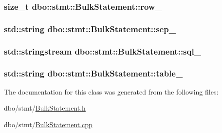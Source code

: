 \hypertarget{classdbo_1_1stmt_1_1_bulk_statement_a354e1122b8e8e2a43769e84f8858023d}{
\subsubsection[{row\+\_\+}]{\setlength{\rightskip}{0pt plus 5cm}size\+\_\+t dbo\+::stmt\+::\+Bulk\+Statement\+::row\+\_\+\hspace{0.3cm}{\ttfamily [protected]}}}\label{classdbo_1_1stmt_1_1_bulk_statement_a354e1122b8e8e2a43769e84f8858023d}
\hypertarget{classdbo_1_1stmt_1_1_bulk_statement_a15af921e3b69e401e9cb2416094dac46}{
\subsubsection[{sep\+\_\+}]{\setlength{\rightskip}{0pt plus 5cm}std\+::string dbo\+::stmt\+::\+Bulk\+Statement\+::sep\+\_\+\hspace{0.3cm}{\ttfamily [protected]}}}\label{classdbo_1_1stmt_1_1_bulk_statement_a15af921e3b69e401e9cb2416094dac46}
\hypertarget{classdbo_1_1stmt_1_1_bulk_statement_ac32b572232a8d0378d420cf44bbca623}{
\subsubsection[{sql\+\_\+}]{\setlength{\rightskip}{0pt plus 5cm}std\+::stringstream dbo\+::stmt\+::\+Bulk\+Statement\+::sql\+\_\+\hspace{0.3cm}{\ttfamily [protected]}}}\label{classdbo_1_1stmt_1_1_bulk_statement_ac32b572232a8d0378d420cf44bbca623}
\hypertarget{classdbo_1_1stmt_1_1_bulk_statement_af3e99f5a3fe342a6295c96927c66c1ed}{
\subsubsection[{table\+\_\+}]{\setlength{\rightskip}{0pt plus 5cm}std\+::string dbo\+::stmt\+::\+Bulk\+Statement\+::table\+\_\+\hspace{0.3cm}{\ttfamily [protected]}}}\label{classdbo_1_1stmt_1_1_bulk_statement_af3e99f5a3fe342a6295c96927c66c1ed}


The documentation for this class was generated from the following files\+:\begin{DoxyCompactItemize}
\item 
dbo/stmt/\hyperlink{_bulk_statement_8h}{Bulk\+Statement.\+h}\item 
dbo/stmt/\hyperlink{_bulk_statement_8cpp}{Bulk\+Statement.\+cpp}\end{DoxyCompactItemize}
